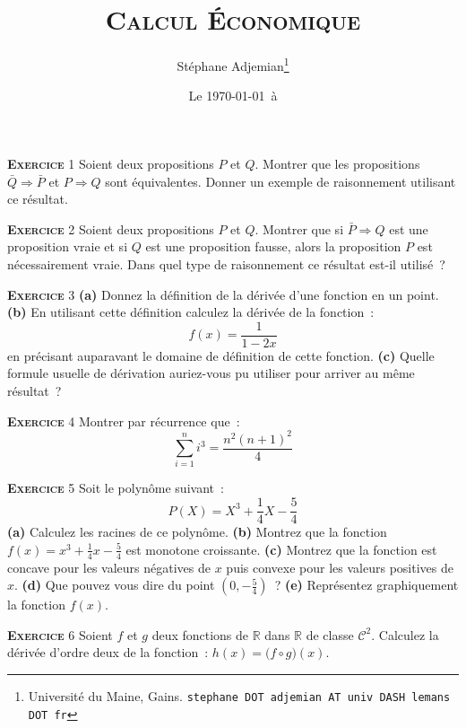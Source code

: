 \documentclass[10pt,a4paper,notitlepage,twocolumn]{article}
\newcommand{\exercice}[1]{\textsc{\textbf{Exercice}} #1}
\begin{document}
\title{\textsc{Calcul Économique}}
\author{Stéphane Adjemian\thanks{Université du Maine, Gains. \texttt{stephane DOT adjemian AT univ DASH lemans DOT fr}}}
\date{Le \today\ à \thistime}

\maketitle
\thispagestyle{empty}

\exercice{1} Soient deux propositions $P$ et $Q$. Montrer que les
propositions $\bar Q \Rightarrow \bar P$ et $P \Rightarrow Q$ sont
équivalentes. Donner un exemple de raisonnement utilisant ce résultat.

\bigskip

\exercice{2} Soient deux propositions $P$ et $Q$. Montrer que si
$\bar P \Rightarrow Q$ est une proposition vraie et si $Q$ est une proposition
fausse, alors la proposition $P$ est nécessairement vraie. Dans quel type de
raisonnement ce résultat est-il utilisé ?
	
\bigskip

\exercice{3} \textbf{(a)} Donnez la définition de la dérivée d'une fonction en
un point. \textbf{(b)} En utilisant cette définition calculez la dérivée de la
fonction~:
\[
f(x) = \frac{1}{1-2x}
\]
en précisant auparavant le domaine de définition de cette fonction. \textbf{(c)}
Quelle formule usuelle de dérivation auriez-vous pu utiliser pour arriver au
même résultat~?

\bigskip

\exercice{4} Montrer par récurrence que~:
\begin{equation}
  \sum_{i=1}^n i^3  = \frac{n^2(n+1)^2}{4}
\end{equation}

\bigskip

\exercice{5} Soit le polynôme suivant~:
\[
P(X) = X^3 + \frac{1}{4}X - \frac{5}{4}
\]    
\textbf{(a)} Calculez les racines de ce polynôme. \textbf{(b)} Montrez que la
fonction $f(x)=x^3+\frac{1}{4}x-\frac{5}{4}$ est monotone croissante.
\textbf{(c)} Montrez que la fonction est concave pour les valeurs négatives de
$x$ puis convexe pour les valeurs positives de $x$. \textbf{(d)} Que pouvez vous
dire du point $(0,-\frac{5}{4})$~? \textbf{(e)} Représentez graphiquement la fonction $f(x)$.

\bigskip

\exercice{6} Soient $f$ et $g$ deux fonctions de $\mathbb R$ dans $\mathbb R$ de
classe $\mathcal C^2$. Calculez la dérivée d'ordre deux de la fonction~:
$h(x) = \bigl(f \circ g\bigr) (x)$.
\end{document}
